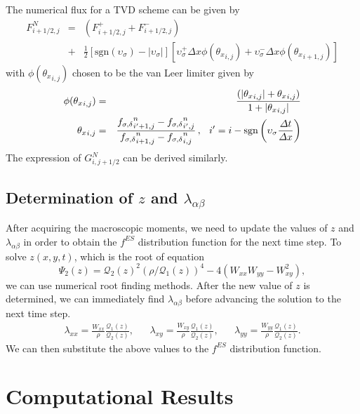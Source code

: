 \documentclass{rsproca}%
\begin{document}
The numerical flux for a TVD scheme can be given by
\begin{eqnarray}
F_{i+1/2,j}^N &=& \left(F_{i+1/2,j}^++F_{i+1/2,j}^-\right)\nonumber\\
&+&\frac{1}{2}\left[{\mbox{sgn}}(\upsilon_{\sigma})-|\upsilon_{\sigma}|\right]\left[\upsilon_\sigma^+\Delta x \phi({\theta_x}_{i,j})+\upsilon_\sigma^-\Delta x \phi({\theta_x}_{i+1,j})\right]
\end{eqnarray}
with $\phi({\theta_x}_{i,j})$ chosen to be the van Leer limiter \cite{vanLeer1979101} given by
\begin{eqnarray}
\phi({\theta_x}_{i,j})&=&\frac{(|{\theta_x}_{i,j}|+{\theta_x}_{i,j})}{1+|{\theta_x}_{i,j}|}\nonumber\\
{\theta_x}_{i,j}&=&\frac{{f_{\sigma,\delta}}_{i'+1,j}^{n}-{f_{\sigma,\delta}}_{i',j}^{n}}{{f_{\sigma,\delta}}_{i+1,j}^{n}-{f_{\sigma,\delta}}_{i,j}^{n}}\,,\hspace{0.1in} i'=i-{\mbox{sgn}}\left(\upsilon_\sigma\frac{\Delta t}{\Delta x}\right)
\end{eqnarray}
The expression of $G_{i,j+1/2}^N$ can be derived similarly.

\subsection{Determination of $z$ and $\lambda_{\alpha \beta}$}
After acquiring the macroscopic moments, we need to update the values of $z$ and $\lambda_{\alpha \beta}$ in order to obtain the $f^{ES}$ distribution function for the next time step.  To solve $z(x,y,t)$, which is the root of equation
\begin{equation}
	\Psi_2(z)=\mathcal{Q}_{2}(z)^2 (\rho/\mathcal{Q}_{1}(z))^{4} - 4 (W_{xx} W_{yy} - W_{xy}^2),
\end{equation}
we can use numerical root finding methods.  After the new value of $z$ is determined, we can immediately find $\lambda_{\alpha \beta}$ before advancing the solution to the next time step.
\begin{align}
&\lambda_{xx} = \frac{W_{xx}}{\rho} \frac{\mathcal{Q}_{1}(z)}{\mathcal{Q}_{2}(z)},&
&\lambda_{xy} = \frac{W_{xy}}{\rho} \frac{\mathcal{Q}_{1}(z)}{\mathcal{Q}_{2}(z)},&
&\lambda_{yy} = \frac{W_{yy}}{\rho} \frac{\mathcal{Q}_{1}(z)}{\mathcal{Q}_{2}(z)}.&
\end{align}
We can then substitute the above values to the $f^{ES}$ distribution function.

\section{Computational Results}
\label{results}
\end{document}
